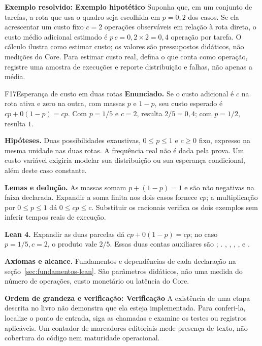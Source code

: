 \begin{resultado}
\textbf{Exemplo resolvido: Exemplo hipotético}  Suponha que, em um conjunto de tarefas, a rota
que usa o quadro seja escolhida em $p=0{,}2$ dos casos. Se ela acrescentar
um custo fixo $c=2$ operações observáveis em relação à rota direta, o custo médio
adicional estimado é $p\,c = 0{,}2\times2=0{,}4$ operação por tarefa. O cálculo
ilustra como estimar custo; os valores são pressupostos didáticos, não medições
do Core. Para estimar custo real, defina o que conta como operação, registre uma
amostra de execuções e reporte distribuição e falhas, não apenas a média.
\end{resultado}

\begin{formalizacao}{F17}{Esperança de custo em duas rotas}
\textbf{Enunciado.} Se o custo adicional é $c$ na rota ativa e zero na
outra, com massas $p$ e $1-p$, seu custo esperado é
$cp+0(1-p)=cp$. Com $p=1/5$ e $c=2$, resulta $2/5=0{,}4$; com $p=1/2$,
resulta $1$.

\textbf{Hipóteses.} Duas possibilidades exaustivas, $0\leq p\leq1$ e
$c\geq0$ fixo, expresso na mesma unidade nas duas rotas. A frequência real
não é dada pela prova. Um custo variável exigiria modelar sua distribuição
ou sua esperança condicional, além deste caso constante.

\textbf{Lemas e dedução.} As massas somam $p+(1-p)=1$ e são não negativas
na faixa declarada. Expandir a soma finita nos dois casos fornece $cp$;
a multiplicação por $0\leq p\leq1$ dá $0\leq cp\leq c$. Substituir os
racionais verifica os dois exemplos sem inferir tempos reais de execução.

\textbf{Lean 4.} Expandir as duas parcelas dá $cp+0(1-p)=cp$; no caso $p=1/5,c=2$, o produto vale $2/5$. Essas duas contas auxiliares são ; .  ,
,
,
,
 e
.

\textbf{Axiomas e alcance.} Fundamentos e dependências de cada declaração
na seção~\ref{sec:fundamentos-lean}. São parâmetros didáticos, não uma
medida do número de operações, custo monetário ou latência do Core.
\end{formalizacao}

\begin{resultado}
\textbf{Ordem de grandeza e verificação: Verificação} A existência de uma etapa descrita no livro não demonstra
que ela esteja implementada. Para conferi-la, localize o ponto de entrada, siga
as chamadas e examine os testes ou registros aplicáveis. Um contador de
marcadores editoriais mede presença de texto, não cobertura do código nem
maturidade operacional.
\end{resultado}

